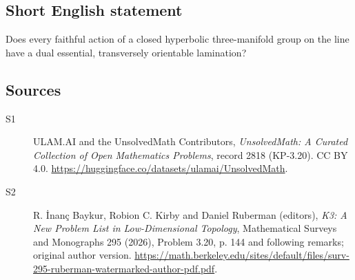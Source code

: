 \documentclass[11pt]{article}
\begin{document}
\subsection{Short English statement}
Does every faithful action of a closed hyperbolic three-manifold group on the line have a dual essential, transversely orientable lamination?
\subsection{Sources}
\begin{description}
\item[\hypertarget{source:2818:1}{S1}] ULAM.AI and the UnsolvedMath Contributors, \emph{UnsolvedMath: A Curated Collection of Open Mathematics Problems}, record 2818 (KP-3.20). CC BY 4.0. \url{https://huggingface.co/datasets/ulamai/UnsolvedMath}.
\item[\hypertarget{source:2818:2}{S2}] R. İnanç Baykur, Robion C. Kirby and Daniel Ruberman (editors), \emph{K3: A New Problem List in Low-Dimensional Topology}, Mathematical Surveys and Monographs 295 (2026), Problem 3.20, p. 144 and following remarks; original author version. \url{https://math.berkeley.edu/sites/default/files/surv-295-ruberman-watermarked-author-pdf.pdf}.
\end{description}
\label{end:2818}
\end{document}

